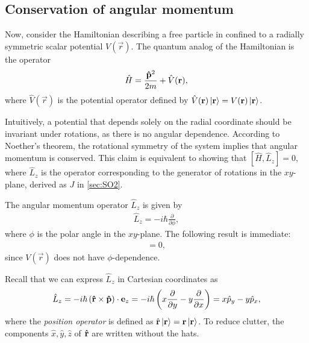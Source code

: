 \subsection{Conservation of angular momentum}\label{sub:cons_ang_mom}
Now, consider the Hamiltonian describing a free particle in confined to a radially symmetric scalar potential $V(\vec{r})$.
The quantum analog of the Hamiltonian is the operator
\begin{align*}
    \hat{H} = \frac{\mathbf{\hat{p}}^2}{2m}  + \hat{V}(\mathbf{r}),
\end{align*}
where $\hat{V}(\vec{r})$ is the potential operator defined by $\hat{V}(\mathbf{r})\ket{\mathbf{r}} = V(\mathbf{r})\ket{\mathbf{r}}$.

Intuitively, a potential that depends solely on the radial coordinate should be invariant under rotations, as there is no angular dependence. According to Noether's theorem, the rotational symmetry of the system implies that angular momentum is conserved. This claim is equivalent to showing that $[\hat{H},\hat{L}_z] = 0$, where $\hat{L}_z$ is the operator corresponding to the generator of rotations in the $xy$-plane, derived as $J$ in \cref{sec:SO2}.

The angular momentum operator $\hat{L}_z$ is given by
\begin{align*}
    \hat{L}_z = -i\hbar \frac{\partial}{\partial\phi},
\end{align*}
where $\phi$ is the polar angle in the $xy$-plane. The following result is immediate:
\begin{align*}
    [V(\vec{r}),\hat{L}_z] = 0,
\end{align*}
since $V(\vec{r})$ does not have $\phi$-dependence.

Recall that we can express $\hat{L}_z$ in Cartesian coordinates as
\begin{align}\label{eq:Lz_cartesian}
    \hat{L}_z = -i\hbar \left( \mathbf{\hat{r}}\times\mathbf{\hat{p}} \right)\cdot\mathbf{e}_z = -i\hbar\left(x\frac{\partial}{\partial y} - y\frac{\partial}{\partial x}\right) = x \hat{p}_y - y \hat{p}_x,
\end{align}
where the \textit{position operator} is defined as $\hat{\mathbf{r}}\ket{\mathbf{r}} = \mathbf{r}\ket{\mathbf{r}}$. To reduce clutter, the components $\hat{x}, \hat{y}, \hat{z}$ of $\mathbf{\hat{r}}$ are written without the hats.

